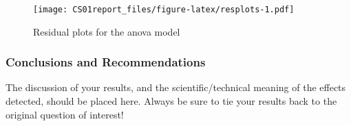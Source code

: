 \documentclass[]{article}
\begin{document}
\begin{figure}
\centering
\texttt{[image: CS01report\_files/figure-latex/resplots-1.pdf]}
\caption{Residual plots for the anova model}
\end{figure}

\hypertarget{conclusions-and-recommendations}{%
\subsubsection{Conclusions and
Recommendations}\label{conclusions-and-recommendations}}

The discussion of your results, and the scientific/technical meaning of
the effects detected, should be placed here. Always be sure to tie your
results back to the original question of interest!
\end{document}
